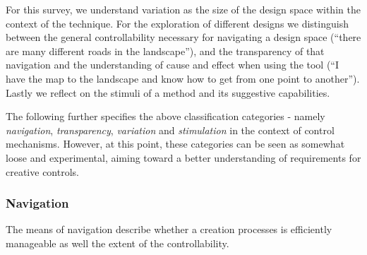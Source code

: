 For this survey, we understand variation as the size of the design space within the context of the technique. For the exploration of different designs we distinguish between the general controllability necessary for navigating a design space (``there are many different roads in the landscape''), and the transparency of that navigation and the understanding of cause and effect when using the tool (``I have the map to the landscape and know how to get from one point to another''). Lastly we reflect on the stimuli of a method and its suggestive capabilities. 

The following further specifies the above classification categories - namely \textit{navigation}, \textit{transparency}, \textit{variation} and \textit{stimulation} in the context of control mechanisms. However, at this point, these categories can be seen as somewhat loose and experimental, aiming toward a better understanding of requirements for creative controls.




\subsubsection{Navigation}
\label{subsubsec:navigation}

The means of navigation describe whether a creation processes is efficiently manageable as well the extent of the controllability.

